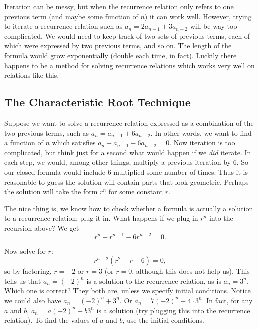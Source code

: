 \documentclass[11pt,]{book}
\theoremstyle{ptxplainnotitle}
\theoremstyle{ptxplaintitle}
\theoremstyle{ptxdefinitionnotitle}
\theoremstyle{ptxdefinitiontitle}
\theoremstyle{ptxdefinitionnotitle}
\theoremstyle{ptxdefinitiontitle}
\theoremstyle{ptxdefinitionnotitle}
\theoremstyle{ptxdefinitiontitle}
\theoremstyle{ptxdefinitiontitlenonumber}
\theoremstyle{ptxdefinitiontitlenonumber}
\numberwithin{equation}{chapter}
\begin{document}
\hypertarget{p-453}{}%
Iteration can be messy, but when the recurrence relation only refers to one previous term (and maybe some function of \(n\)) it can work well. However, trying to iterate a recurrence relation such as \(a_n = 2 a_{n-1} + 3 a_{n-2}\) will be way too complicated. We would need to keep track of two sets of previous terms, each of which were expressed by two previous terms, and so on. The length of the formula would grow exponentially (double each time, in fact). Luckily there happens to be a method for solving recurrence relations which works very well on relations like this.%
\typeout{************************************************}
\typeout{************************************************}
\subsection[{The Characteristic Root Technique}]{The Characteristic Root Technique}\label{subsection-2}
\hypertarget{p-454}{}%
Suppose we want to solve a recurrence relation expressed as a combination of the two previous terms, such as \(a_n = a_{n-1} + 6a_{n-2}\). In other words, we want to find a function of \(n\) which satisfies \(a_n - a_{n-1} - 6a_{n-2} = 0\). Now iteration is too complicated, but think just for a second what would happen if we \emph{did} iterate. In each step, we would, among other things, multiply a previous iteration by 6. So our closed formula would include \(6\) multiplied some number of times. Thus it is reasonable to guess the solution will contain parts that look geometric. Perhaps the solution will take the form \(r^n\) for some constant \(r\).%
\par
\hypertarget{p-455}{}%
The nice thing is, we know how to check whether a formula is actually a solution to a recurrence relation: plug it in. What happens if we plug in \(r^n\) into the recursion above? We get%
\begin{equation*}
r^n - r^{n-1} - 6r^{n-2} = 0.
\end{equation*}
%
\par
\hypertarget{p-456}{}%
Now solve for \(r\):%
\begin{equation*}
r^{n-2}(r^2 - r - 6) = 0,
\end{equation*}
so by factoring, \(r = -2\) or \(r = 3\) (or \(r = 0\), although this does not help us). This tells us that \(a_n = (-2)^n\) is a solution to the recurrence relation, as is \(a_n = 3^n\). Which one is correct? They both are, unless we specify initial conditions. Notice we could also have \(a_n = (-2)^n + 3^n\). Or \(a_n = 7(-2)^n + 4\cdot 3^n\). In fact, for any \(a\) and \(b\), \(a_n = a(-2)^n + b 3^n\) is a solution (try plugging this into the recurrence relation). To find the values of \(a\) and \(b\), use the initial conditions.%
\end{document}

